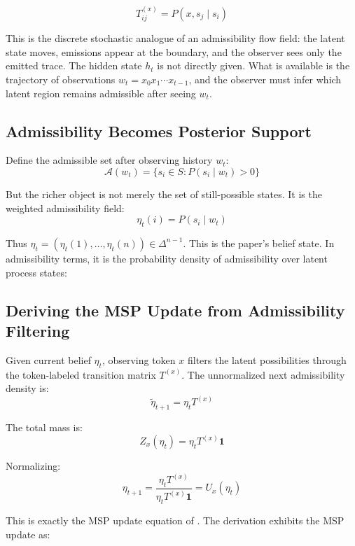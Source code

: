 \documentclass[12pt, a4paper]{article}
\theoremstyle{plain}
\theoremstyle{definition}
\theoremstyle{remark}
\begin{document}
$$T^{(x)}_{ij} = P(x, s_j \mid s_i)$$

This is the discrete stochastic analogue of an admissibility flow field:
the latent state moves, emissions appear at the boundary, and the observer
sees only the emitted trace. The hidden state $h_t$ is not directly given.
What is available is the trajectory of observations $w_t = x_0 x_1 \cdots
x_{t-1}$, and the observer must infer which latent region remains admissible
after seeing $w_t$.

\subsection{Admissibility Becomes Posterior Support}

Define the admissible set after observing history $w_t$:
$$\mathcal{A}(w_t) = \{s_i \in S : P(s_i \mid w_t) > 0\}$$

But the richer object is not merely the set of still-possible states.
It is the weighted admissibility field:
$$\eta_t(i) = P(s_i \mid w_t)$$

Thus $\eta_t = (\eta_t(1), \ldots, \eta_t(n)) \in \Delta^{n-1}$. This is
the paper's belief state. In admissibility terms, it is the probability
density of admissibility over latent process states:

\begin{center}
\end{center}

\subsection{Deriving the MSP Update from Admissibility Filtering}

Given current belief $\eta_t$, observing token $x$ filters the latent
possibilities through the token-labeled transition matrix $T^{(x)}$.
The unnormalized next admissibility density is:
$$\tilde{\eta}_{t+1} = \eta_t T^{(x)}$$

The total mass is:
$$Z_x(\eta_t) = \eta_t T^{(x)} \mathbf{1}$$

Normalizing:
$$\eta_{t+1} = \frac{\eta_t T^{(x)}}{\eta_t T^{(x)} \mathbf{1}} = U_x(\eta_t)$$

This is exactly the MSP update equation of \citet{shai2025}. The derivation
exhibits the MSP update as:

\begin{center}
\end{center}
\end{document}
